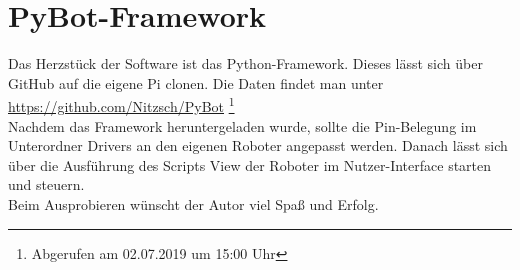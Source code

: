 \documentclass[a4paper,cleardoubleempty,BCOR1cm]{book}
\begin{document}
\section{PyBot-Framework}
Das Herzstück der Software ist das Python-Framework. Dieses lässt sich über GitHub auf die eigene Pi clonen. Die Daten findet man unter \url{https://github.com/Nitzsch/PyBot} \footnote{Abgerufen am 02.07.2019 um 15:00 Uhr}\\
Nachdem das Framework heruntergeladen wurde, sollte die Pin-Belegung im Unterordner Drivers an den eigenen Roboter angepasst werden. Danach lässt sich über die Ausführung des Scripts View der Roboter im Nutzer-Interface starten und steuern. \\
Beim Ausprobieren wünscht der Autor viel Spaß und Erfolg. 





\end{document}
